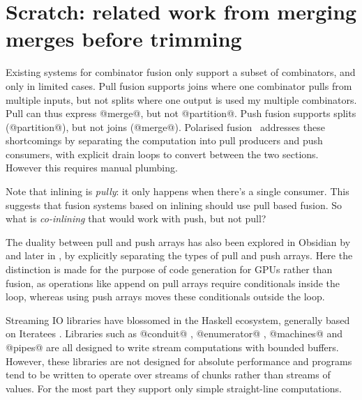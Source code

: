 \section{Scratch: related work from merging merges before trimming}

Existing systems for combinator fusion only support a subset of combinators, and only in limited cases.
Pull fusion supports joins where one combinator pulls from multiple inputs, but not splits where one output is used my multiple combinators.
Pull can thus express @merge@, but not @partition@.
Push fusion supports splits (@partition@), but not joins (@merge@).
Polarised fusion~\cite{lippmeier2016polarized} addresses these shortcomings by separating the computation into pull producers and push consumers, with explicit drain loops to convert between the two sections. However this requires manual plumbing.

Note that inlining is \emph{pully}: it only happens when there's a single consumer.
This suggests that fusion systems based on inlining should use pull based fusion.
So what is \emph{co-inlining} that would work with push, but not pull?

The duality between pull and push arrays has also been explored in Obsidian by \citep{claessen2012expressive} and later in \citep{svensson2014defunctionalizing}, by explicitly separating the types of pull and push arrays.
Here the distinction is made for the purpose of code generation for GPUs rather than fusion, as operations like append on pull arrays require conditionals inside the loop, whereas using push arrays moves these conditionals outside the loop.

Streaming IO libraries have blossomed in the Haskell ecosystem, generally based on Iteratees \cite{kiselyov2012iteratees}.
Libraries such as @conduit@ \cite{hackage:conduit}, @enumerator@ \cite{hackage:enumerator}, @machines@ \cite{hackage:machines} and @pipes@ \cite{hackage:pipes} are all designed to write stream computations with bounded buffers.
However, these libraries are not designed for absolute performance and programs tend to be written to operate over streams of chunks rather than streams of values.
For the most part they support only simple straight-line computations.

